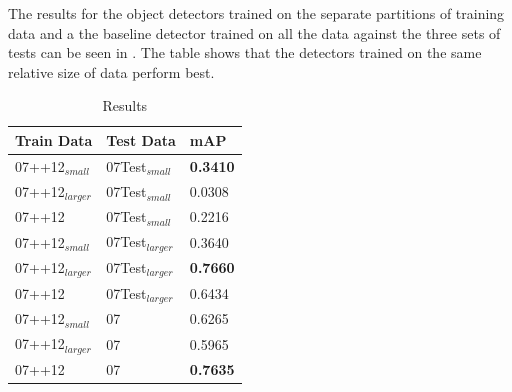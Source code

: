 The results for the object detectors trained on the separate partitions of training data and a the baseline detector trained on all the data against the three sets of tests can be seen in . The table shows that the detectors trained on the same relative size of data perform best.


\begin{table}[h]
\centering
\caption{Results}
\label{tab:resresults}
\begin{tabular}{|l|l|l|}
\hline
\textbf{Train Data}    & \textbf{Test Data}     & \textbf{mAP} \\ \hline
07++12$_{small}$ & 07Test$_{small}$  & \textbf{0.3410}   \\ \hline
07++12$_{larger}$  & 07Test$_{small}$ & 0.0308     \\ \hline
07++12   & 07Test$_{small}$           & 0.2216    \\ \hline
07++12$_{small}$ & 07Test$_{larger}$  &  0.3640   \\ \hline
07++12$_{larger}$ & 07Test$_{larger}$ &  \textbf{0.7660}   \\ \hline
07++12 & 07Test$_{larger}$           &  0.6434   \\ \hline
07++12$_{small}$       & 07   & 0.6265    \\ \hline
07++12$_{larger}$       & 07  &  0.5965   \\ \hline
07++12        & 07            &  \textbf{0.7635}   \\ \hline 
\end{tabular}
\end{table}
